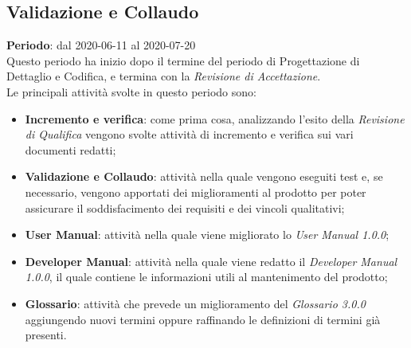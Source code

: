 \subsection{Validazione e Collaudo}
\textbf{Periodo}: dal 2020-06-11 al 2020-07-20 \\
Questo periodo ha inizio dopo il termine del periodo di Progettazione di Dettaglio e Codifica, e termina con la \textit{Revisione di Accettazione}. \\
Le principali attività svolte in questo periodo sono:
\begin{itemize}
	\item \textbf{Incremento e verifica}: come prima cosa, analizzando l'esito della \textit{Revisione di Qualifica} vengono svolte attività di incremento e verifica sui vari documenti redatti;
	\item \textbf{Validazione e Collaudo}: attività nella quale vengono eseguiti test e, se necessario, vengono apportati dei miglioramenti al prodotto per poter assicurare il soddisfacimento dei requisiti e dei vincoli qualitativi;
	\item \textbf{User Manual}: attività nella quale viene migliorato lo \textit{User Manual 1.0.0};
	\item \textbf{Developer Manual}: attività nella quale viene redatto il \textit{Developer Manual 1.0.0}, il quale contiene le informazioni utili al mantenimento del prodotto;
	\item \textbf{Glossario}: attività che prevede un miglioramento del \textit{Glossario 3.0.0} aggiungendo nuovi termini oppure raffinando le definizioni di termini già presenti.
\end{itemize}
